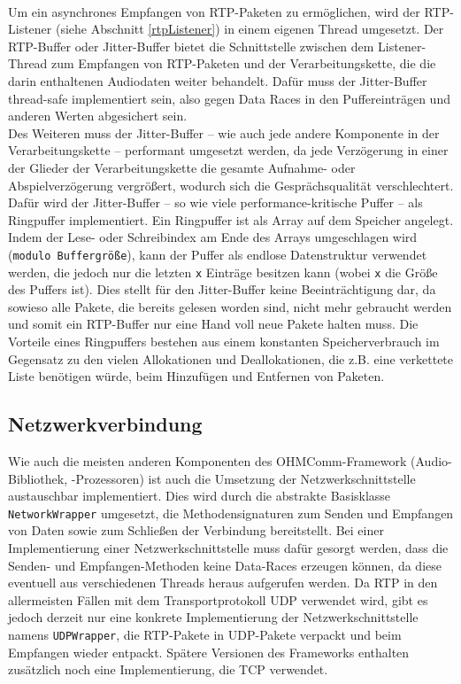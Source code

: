 \\
Um ein asynchrones Empfangen von RTP-Paketen zu ermöglichen, wird der RTP-Listener (siehe Abschnitt \ref{rtpListener}) in einem eigenen Thread umgesetzt. Der RTP-Buffer oder Jitter-Buffer bietet die Schnittstelle zwischen dem Listener-Thread zum Empfangen von RTP-Paketen und der Verarbeitungskette, die die darin enthaltenen Audiodaten weiter behandelt. Dafür muss der Jitter-Buffer thread-safe implementiert sein, also gegen Data Races in den Puffereinträgen und anderen Werten abgesichert sein.
\\
Des Weiteren muss der Jitter-Buffer -- wie auch jede andere Komponente in der Verarbeitungskette -- performant umgesetzt werden, da jede Verzögerung in einer der Glieder der Verarbeitungskette die gesamte Aufnahme- oder Abspielverzögerung vergrößert, wodurch sich die Gesprächsqualität verschlechtert. Dafür wird der Jitter-Buffer -- so wie viele performance-kritische Puffer -- als Ringpuffer implementiert. Ein Ringpuffer ist als Array auf dem Speicher angelegt. Indem der Lese- oder Schreibindex am Ende des Arrays umgeschlagen wird (\texttt{modulo Buffergröße}), kann der Puffer als endlose Datenstruktur verwendet werden, die jedoch nur die letzten \texttt{x} Einträge besitzen kann (wobei \texttt{x} die Größe des Puffers ist). Dies stellt für den Jitter-Buffer keine Beeinträchtigung dar, da sowieso alle Pakete, die bereits gelesen worden sind, nicht mehr gebraucht werden und somit ein RTP-Buffer nur eine Hand voll neue Pakete halten muss. Die Vorteile eines Ringpuffers bestehen aus einem konstanten Speicherverbrauch im Gegensatz zu den vielen Allokationen und Deallokationen, die z.B. eine verkettete Liste benötigen würde, beim Hinzufügen und Entfernen von Paketen.
\subsection{Netzwerkverbindung}
Wie auch die meisten anderen Komponenten des OHMComm-Framework (Audio-Bibliothek, -Prozessoren) ist auch die Umsetzung der Netzwerkschnittstelle austauschbar implementiert. Dies wird durch die abstrakte Basisklasse \texttt{NetworkWrap\-per} umgesetzt, die Methodensignaturen zum Senden und Empfangen von Daten sowie zum Schließen der Verbindung bereitstellt. Bei einer Implementierung einer Netzwerkschnittstelle muss dafür gesorgt werden, dass die Senden- und Empfangen-Methoden keine Data-Races erzeugen können, da diese eventuell aus verschiedenen Threads heraus aufgerufen werden. Da RTP in den allermeisten Fällen mit dem Transportprotokoll UDP verwendet wird, gibt es jedoch derzeit nur eine konkrete Implementierung der Netzwerkschnittstelle namens \texttt{UDPWrapper}, die RTP-Pakete in UDP-Pakete verpackt und beim Empfangen wieder entpackt. Spätere Versionen des Frameworks enthalten zusätzlich noch eine Implementierung, die TCP verwendet.

